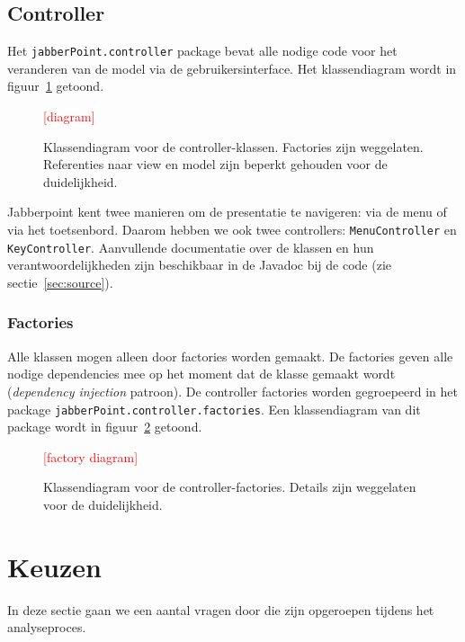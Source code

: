 \documentclass[a4paper]{article}
\newcommand{\todo}[1]{\textcolor{red}{[#1]}\\}
\newcommand{\code}[1]{\lstinline[columns=fixed]{#1}}
\begin{document}
	\subsection{Controller}\label{sec:controller}
		Het \code{jabberPoint.controller} package bevat alle nodige code voor het veranderen van de model via de gebruikersinterface.
		Het klassendiagram wordt in figuur~\ref{diagram:controller} getoond.

		\begin{figure}[!htb]
		 \caption{
			Klassendiagram voor de controller-klassen.\label{diagram:controller}
			Factories zijn weggelaten.
			Referenties naar view en model zijn beperkt gehouden voor de duidelijkheid.
		 }
		 \todo{diagram} %
		\end{figure}

		Jabberpoint kent twee manieren om de presentatie te navigeren: via de menu of via het toetsenbord.
		Daarom hebben we ook twee controllers: \code{MenuController} en \code{KeyController}.
		Aanvullende documentatie over de klassen en hun verantwoordelijkheden zijn beschikbaar in de Javadoc bij de code (zie sectie~\ref{sec:source}).

		\subsubsection{Factories}\label{sec:controller-factories}
			Alle klassen mogen alleen door factories worden gemaakt.
			De factories geven alle nodige dependencies mee op het moment dat de klasse gemaakt wordt (\textit{dependency injection} patroon).
			De controller factories worden gegroepeerd in het package \code{jabberPoint.controller.factories}.
			Een klassendiagram van dit package wordt in figuur~\ref{diagram:controller-factories} getoond.

			\begin{figure}[!htb]
			 \caption{
				Klassendiagram voor de controller-factories.\label{diagram:controller-factories}
				Details zijn weggelaten voor de duide\-lijk\-heid.
			 }
			 \todo{factory diagram} %
			\end{figure}


\section{Keuzen}\label{sec:keuzen}
    In deze sectie gaan we een aantal vragen door die zijn opgeroepen tijdens het analyseproces.
   
\end{document}
